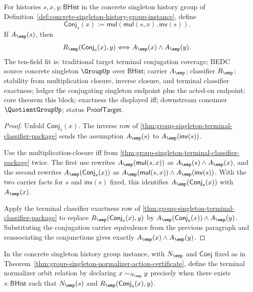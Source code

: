 \begin{theorem}
\label{thm:group-singleton-conjugation-classifier-coverage}
For histories $s,x,y:\mathsf{BHist}$ in the concrete singleton history group of
Definition~\ref{def:concrete-singleton-history-group-instance}, define
$$
\mathsf{Conj}_s(x):=\mathsf{mul}(\mathsf{mul}(s,x),\mathsf{inv}(s)).
$$
If $A_{\emp}(s)$, then
$$
R_{\emp}(\mathsf{Conj}_s(x),y)\Longleftrightarrow
A_{\emp}(x)\land A_{\emp}(y).
$$
The ten-field fit is: traditional target terminal conjugation coverage; BEDC
source concrete singleton $\GroupUp$ over $\mathsf{BHist}$; carrier
$A_{\emp}$; classifier $R_{\emp}$; stability from multiplication closure,
inverse closure, and terminal classifier exactness; ledger the conjugating
singleton endpoint plus the acted-on endpoint; core theorem this block;
exactness the displayed iff; downstream consumer $\QuotientGroupUp$; status
$\mathsf{ProofTarget}$.
\end{theorem}
\begin{proof}
Unfold $\mathsf{Conj}_s(x)$. The inverse row of
\autoref{thm:group-singleton-terminal-classifier-package} sends the assumption
$A_{\emp}(s)$ to $A_{\emp}(\mathsf{inv}(s))$.

Use the multiplication-closure iff from
\autoref{thm:group-singleton-terminal-classifier-package} twice. The first use
rewrites $A_{\emp}(\mathsf{mul}(s,x))$ as
$A_{\emp}(s)\land A_{\emp}(x)$, and the second rewrites
$A_{\emp}(\mathsf{Conj}_s(x))$ as
$A_{\emp}(\mathsf{mul}(s,x))\land A_{\emp}(\mathsf{inv}(s))$. With the two
carrier facts for $s$ and $\mathsf{inv}(s)$ fixed, this identifies
$A_{\emp}(\mathsf{Conj}_s(x))$ with $A_{\emp}(x)$.

Apply the terminal classifier exactness row of
\autoref{thm:group-singleton-terminal-classifier-package} to replace
$R_{\emp}(\mathsf{Conj}_s(x),y)$ by
$A_{\emp}(\mathsf{Conj}_s(x))\land A_{\emp}(y)$. Substituting the conjugation
carrier equivalence from the previous paragraph and reassociating the
conjunctions gives exactly
$A_{\emp}(x)\land A_{\emp}(y)$.
\end{proof}

\begin{definition}
\label{def:group-singleton-normalizer-orbit-relation}
In the concrete singleton history group instance, with $N_{\emp}$ and
$\mathsf{Conj}$ fixed as in
Theorem~\ref{thm:group-singleton-normalizer-action-certificate}, define the
terminal normalizer orbit relation by declaring
$x\sim_{N_{\emp}}y$ precisely when there exists $s:\mathsf{BHist}$ such that
$N_{\emp}(s)$ and $R_{\emp}(\mathsf{Conj}_s(x),y)$.
\end{definition}

